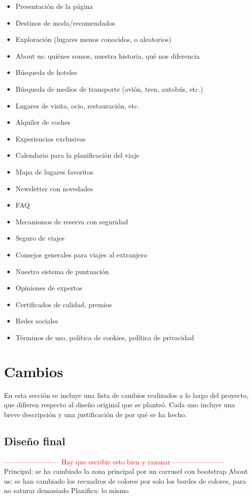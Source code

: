 \documentclass[11pt, a4paper]{book}
\begin{document}
	\begin{itemize}
		\item Presentación de la página
		\item Destinos de moda/recomendados
		\item Exploración (lugares menos conocidos, o aleatorios)
		\item About us: quiénes somos, nuestra historia, qué nos diferencia
		\item Búsqueda de hoteles
		\item Búsqueda de medios de transporte (avión, tren, autobús, etc.)
		\item Lugares de visita, ocio, restauración, etc.
		\item Alquiler de coches
		\item Experiencias exclusivas
		\item Calendario para la planificación del viaje
		\item Mapa de lugares favoritos
		\item Newsletter con novedades
		\item FAQ
		\item Mecanismos de reserva con seguridad
		\item Seguro de viajes
		\item Consejos generales para viajes al extranjero
		\item Nuestro sistema de puntuación
		\item Opiniones de expertos
		\item Certificados de calidad, premios
		\item Redes sociales
		\item Términos de uso, política de cookies, política de privacidad
	\end{itemize}


	\section{Cambios}
	\label{sect:anexo2}
	En esta sección se incluye una lista de cambios realizados a lo largo del proyecto, que difieren respecto al diseño original que se planteó. Cada uno incluye una breve descripción y una justificación de por qué se ha hecho.
	
	\subsection{Diseño final}
	\textcolor{red}{------------------------ Hay que escribir esto bien y razonar -----------------------}
	Principal: se ha cambiado la zona principal por un carrusel con bootstrap
	About us: se han cambiado los recuadros de colores por solo los bordes de colores, para no saturar demasiado
	Planifica: lo mismo
	
\end{document}
